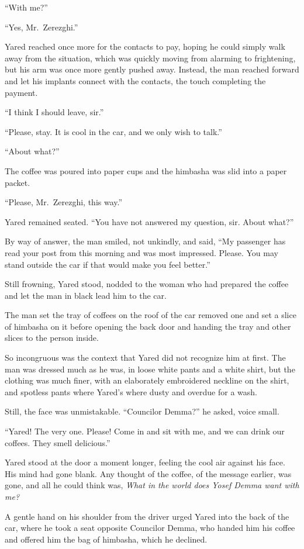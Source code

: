 ``With me?''

``Yes, Mr.~Zerezghi.''

Yared reached once more for the contacts to pay, hoping he could simply walk away from the situation, which was quickly moving from alarming to frightening, but his arm was once more gently pushed away. Instead, the man reached forward and let his implants connect with the contacts, the touch completing the payment.

``I think I should leave, sir.''

``Please, stay. It is cool in the car, and we only wish to talk.''

``About what?''

The coffee was poured into paper cups and the himbasha was slid into a paper packet.

``Please, Mr.~Zerezghi, this way.''

Yared remained seated. ``You have not answered my question, sir. About what?''

By way of answer, the man smiled, not unkindly, and said, ``My passenger has read your post from this morning and was most impressed. Please. You may stand outside the car if that would make you feel better.''

Still frowning, Yared stood, nodded to the woman who had prepared the coffee and let the man in black lead him to the car.

The man set the tray of coffees on the roof of the car removed one and set a slice of himbasha on it before opening the back door and handing the tray and other slices to the person inside.

So incongruous was the context that Yared did not recognize him at first. The man was dressed much as he was, in loose white pants and a white shirt, but the clothing was much finer, with an elaborately embroidered neckline on the shirt, and spotless pants where Yared's where dusty and overdue for a wash.

Still, the face was unmistakable. ``Councilor Demma?'' he asked, voice small.

``Yared! The very one. Please! Come in and sit with me, and we can drink our coffees. They smell delicious.''

Yared stood at the door a moment longer, feeling the cool air against his face. His mind had gone blank. Any thought of the coffee, of the message earlier, was gone, and all he could think was, \emph{What in the world does Yosef Demma want with me?}

A gentle hand on his shoulder from the driver urged Yared into the back of the car, where he took a seat opposite Councilor Demma, who handed him his coffee and offered him the bag of himbasha, which he declined.

